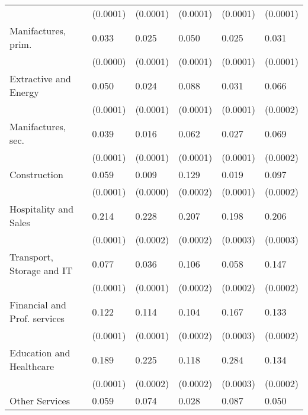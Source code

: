 \begin{tabular}{llllll}
                             &  (0.0001) &  (0.0001) &  (0.0001) &           (0.0001) &         (0.0001) \\
Manifactures, prim.          &     0.033 &     0.025 &     0.050 &              0.025 &            0.031 \\
                             &  (0.0000) &  (0.0001) &  (0.0001) &           (0.0001) &         (0.0001) \\
Extractive and Energy        &     0.050 &     0.024 &     0.088 &              0.031 &            0.066 \\
                             &  (0.0001) &  (0.0001) &  (0.0001) &           (0.0001) &         (0.0002) \\
Manifactures, sec.           &     0.039 &     0.016 &     0.062 &              0.027 &            0.069 \\
                             &  (0.0001) &  (0.0001) &  (0.0001) &           (0.0001) &         (0.0002) \\
Construction                 &     0.059 &     0.009 &     0.129 &              0.019 &            0.097 \\
                             &  (0.0001) &  (0.0000) &  (0.0002) &           (0.0001) &         (0.0002) \\
Hospitality and Sales        &     0.214 &     0.228 &     0.207 &              0.198 &            0.206 \\
                             &  (0.0001) &  (0.0002) &  (0.0002) &           (0.0003) &         (0.0003) \\
Transport, Storage and IT    &     0.077 &     0.036 &     0.106 &              0.058 &            0.147 \\
                             &  (0.0001) &  (0.0001) &  (0.0002) &           (0.0002) &         (0.0002) \\
Financial and Prof. services &     0.122 &     0.114 &     0.104 &              0.167 &            0.133 \\
                             &  (0.0001) &  (0.0001) &  (0.0002) &           (0.0003) &         (0.0002) \\
Education and Healthcare     &     0.189 &     0.225 &     0.118 &              0.284 &            0.134 \\
                             &  (0.0001) &  (0.0002) &  (0.0002) &           (0.0003) &         (0.0002) \\
Other Services               &     0.059 &     0.074 &     0.028 &              0.087 &            0.050 \\

\end{tabular}

